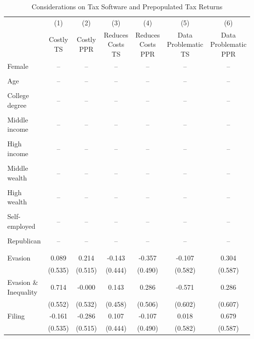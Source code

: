 \documentclass[11pt]{article}
\begin{document}
\FloatBarrier
\begin{landscape}
\begin{table}[!htbp]\centering
\caption{Considerations on Tax Software and Prepopulated Tax Returns}
\label{tab:considerationsts_noc}
\begin{threeparttable}
\footnotesize
\begin{tabular}{l|cccccc}
\toprule
& (1) & (2) & (3) & (4) & (5) & (6) \\
& Costly TS & Costly PPR & Reduces Costs TS & Reduces Costs PPR & Data Problematic TS & Data Problematic PPR \\
\midrule
Female & -- & -- & -- & -- & -- & -- \\
 &  &  &  &  &  &  \\
Age & -- & -- & -- & -- & -- & -- \\
 &  &  &  &  &  &  \\
College degree & -- & -- & -- & -- & -- & -- \\
 &  &  &  &  &  &  \\
Middle income & -- & -- & -- & -- & -- & -- \\
 &  &  &  &  &  &  \\
High income & -- & -- & -- & -- & -- & -- \\
 &  &  &  &  &  &  \\
Middle wealth & -- & -- & -- & -- & -- & -- \\
 &  &  &  &  &  &  \\
High wealth & -- & -- & -- & -- & -- & -- \\
 &  &  &  &  &  &  \\
Self-employed & -- & -- & -- & -- & -- & -- \\
 &  &  &  &  &  &  \\
Republican & -- & -- & -- & -- & -- & -- \\
 &  &  &  &  &  &  \\
\\[0.5em]
Evasion & 0.089 & 0.214 & -0.143 & -0.357 & -0.107 & 0.304 \\
 & (0.535) & (0.515) & (0.444) & (0.490) & (0.582) & (0.587) \\
Evasion \& Inequality & 0.714 & -0.000 & 0.143 & 0.286 & -0.571 & 0.286 \\
 & (0.552) & (0.532) & (0.458) & (0.506) & (0.602) & (0.607) \\
Filing & -0.161 & -0.286 & 0.107 & -0.107 & 0.018 & 0.679 \\
 & (0.535) & (0.515) & (0.444) & (0.490) & (0.582) & (0.587) \\

\end{tabular}
\end{threeparttable}
\end{table}
\end{landscape}
\end{document}

